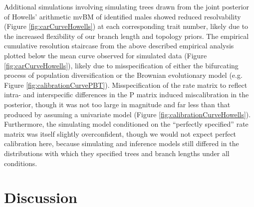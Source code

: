 
Additional simulations involving simulating trees drawn from the joint posterior of Howells’ arithmetic mvBM of identified males showed reduced resolvability (Figure \ref{fig:carCurveHowells}) at each corresponding trait number, likely due to the increased flexibility of our branch length and topology priors. The empirical cumulative resolution staircase from the above described empirical analysis plotted below the mean curve observed for simulated data (Figure \ref{fig:carCurveHowells}), likely due to misspecification of either the bifurcating process of population diversification or the Brownian evolutionary model (e.g. Figure \ref{fig:calibrationCurvePBT}). Misspecification of the rate matrix to reflect intra- and interspecific differences in the P matrix induced miscalibration in the posterior, though it was not too large in magnitude and far less than that produced by assuming a univariate model (Figure \ref{fig:calibrationCurveHowells}). Furthermore, the simulating model conditioned on the “perfectly specified” rate matrix was itself slightly overconfident, though we would not expect perfect calibration here, because simulating and inference models still differed in the distributions with which they specified trees and branch lengths under all conditions.

\clearpage

\section{Discussion}

